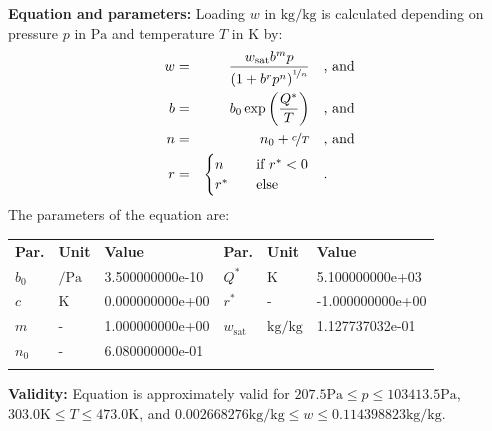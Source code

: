 \textbf{Equation and parameters:}
\newline
%
Loading $w$ in $\si{\kilogram\per\kilogram}$ is calculated depending on pressure $p$ in $\si{\pascal}$ and temperature $T$ in $\si{\kelvin}$ by:
%
\begin{equation*}
\begin{split}
w &=& \frac{w_\mathrm{sat} b^{m} p}{\left( 1 + b^{r} p^{n} \right)^{\nicefrac{1}{n}}} & \quad\text{, and} \\
b &=& b_0 \exp\left( \frac{Q^{*}}{T} \right) & \quad\text{, and} \\
n &=& n_0 + \nicefrac{c}{T} & \quad\text{, and} \\
r &=& \begin{cases} n & \quad \text{if } r^{*} < 0 \\ r^{*}  & \quad \text{else} \end{cases} & \quad\text{.}
\end{split}
\end{equation*}
%
The parameters of the equation are:
%
\begin{longtable}[l]{lll|lll}
\toprule
\addlinespace
\textbf{Par.} & \textbf{Unit} & \textbf{Value} &	\textbf{Par.} & \textbf{Unit} & \textbf{Value} \\
\addlinespace
\midrule
\endhead

\bottomrule
\endfoot
\bottomrule
\endlastfoot
\addlinespace

$b_0$ & $\si{\per\pascal}$ & 3.500000000e-10 & $Q^{*}$ & $\si{\kelvin}$ & 5.100000000e+03 \\
$c$ & $\si{\kelvin}$ & 0.000000000e+00 & $r^{*}$ & - & -1.000000000e+00 \\
$m$ & - & 1.000000000e+00 & $w_\mathrm{sat}$ & $\si{\kilogram\per\kilogram}$ & 1.127737032e-01 \\
$n_0$ & - & 6.080000000e-01 & & & \\

\addlinespace\end{longtable}

\textbf{Validity:}
\newline
Equation is approximately valid for $207.5 \si{\pascal} \leq p \leq 103413.5 \si{\pascal}$,  $303.0 \si{\kelvin} \leq T \leq 473.0 \si{\kelvin}$, and $0.002668276 \si{\kilogram\per\kilogram} \leq w \leq 0.114398823 \si{\kilogram\per\kilogram}$.
\newline


